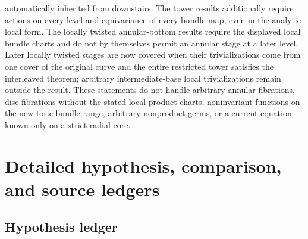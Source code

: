 automatically inherited from downstairs.  The tower results additionally
require actions on every level and equivariance of every bundle map, even in
the analytic-local form.  The locally twisted annular-bottom results require
the displayed local bundle charts and do not by themselves permit an annular
stage at a later level.  Later locally twisted stages are now covered when
their trivializations come from one cover of the original curve and the
entire restricted tower satisfies the interleaved theorem; arbitrary
intermediate-base local trivializations remain outside the result.  These
statements do not handle arbitrary annular fibrations, disc fibrations
without the stated local product charts, noninvariant functions on the new
toric-bundle range, arbitrary nonproduct germs, or a current equation known
only on a strict radial core.


\section{Detailed hypothesis, comparison, and source ledgers}
\label{sec:appM-ledgers}

\subsection{Hypothesis ledger}
\label{sec:ch18-hypothesis-ledger}

